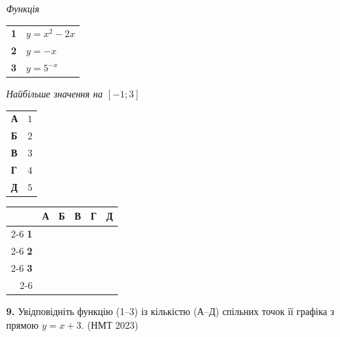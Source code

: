 \documentclass[14pt]{extarticle}
\newcommand{\answerGrid}{
    \begingroup
    \setlength{\tabcolsep}{4pt}
    \renewcommand{\arraystretch}{1.2}
    \small
    \begin{tabular}{r|c|c|c|c|c|}
         \multicolumn{1}{c}{} & \multicolumn{1}{c}{\textbf{А}} & \multicolumn{1}{c}{\textbf{Б}} & \multicolumn{1}{c}{\textbf{В}} & \multicolumn{1}{c}{\textbf{Г}} & \multicolumn{1}{c}{\textbf{Д}} \\ \cline{2-6}
         \textbf{1} & & & & & \\ \cline{2-6}
         \textbf{2} & & & & & \\ \cline{2-6}
         \textbf{3} & & & & & \\ \cline{2-6}
    \end{tabular}
    \endgroup
}
\newcommand{\nmtyear}[1]{\hfill{\small\color{yearcolor}(НМТ #1)}}
\begin{document}
\noindent
\begin{minipage}[t]{0.45\textwidth}
    \textit{Функція} \par \vspace{0.2cm}
    \begin{tabular}{@{}p{0.5cm} l@{}}
    \textbf{1} & $y = x^2 - 2x$ \\[0.4cm]
    \textbf{2} & $y = -x$ \\[0.4cm]
    \textbf{3} & \colorbox{yellow!30}{$y = 5^{-x}$} \\
    \end{tabular}
\end{minipage}%
\hfill
\begin{minipage}[t]{0.50\textwidth}
    \textit{Найбільше значення на $[-1; 3]$} \par \vspace{0.2cm}
    \begin{tabular}{@{}p{0.5cm} p{7cm}@{}}
    \textbf{А} & $1$ \\[0.2cm]
    \textbf{Б} & $2$ \\[0.2cm]
    \textbf{В} & $3$ \\[0.2cm]
    \textbf{Г} & $4$ \\[0.2cm]
    \textbf{Д} & $5$ \\
    \end{tabular}
\end{minipage}
\vspace{0.3cm}

\answerGrid
\vspace{0.7cm}

\noindent\textbf{9.} Увідповідніть функцію (1–3) із кількістю (А–Д) спільних точок її графіка з прямою $y = x + 3$. \nmtyear{2023}
\vspace{0.3cm}
\end{document}
